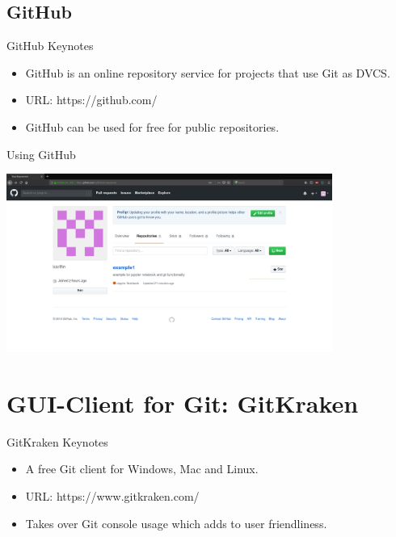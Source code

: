 \documentclass[xcolor=dvipsnames]{beamer}
\begin{document}
\subsection{GitHub}

\begin{frame}{GitHub Keynotes}

\begin{itemize}

	\item GitHub is an online repository service for projects that use Git as DVCS.
	\item URL: https://github.com/
	\item GitHub can be used for free for public repositories.

\end{itemize}

\end{frame}

\begin{frame}{Using GitHub}

\includegraphics[width = 0.8\textwidth]{github.png}

\end{frame}

\section{GUI-Client for Git: GitKraken}

\begin{frame}{GitKraken Keynotes}
\begin{itemize}

	\item A free Git client for Windows, Mac and Linux.
	\item URL: https://www.gitkraken.com/
	\item Takes over Git console usage which adds to user friendliness.

\end{itemize}
\end{frame}
\end{document}
